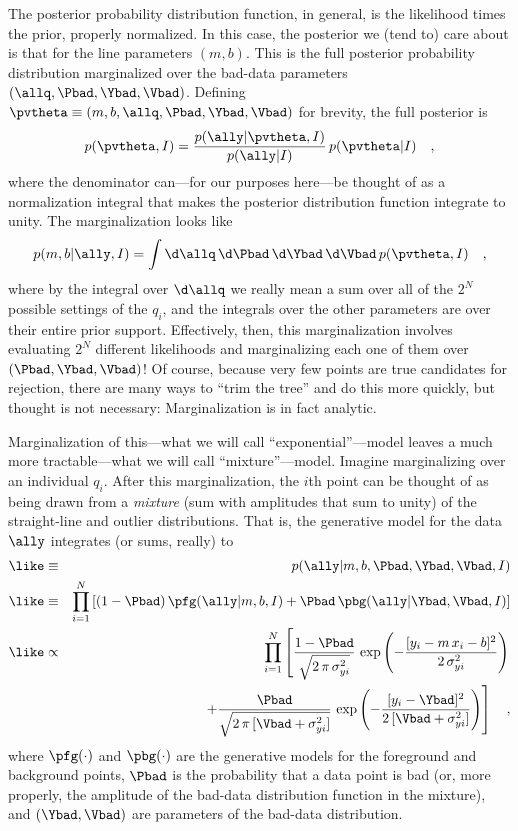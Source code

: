 \documentclass[12pt,twoside,pdftex]{article}
\begin{document}
The posterior probability distribution function, in general, is the
likelihood times the prior, properly normalized.  In this case, the
posterior we (tend to) care about is that for the line parameters
$(m,b)$.  This is the full posterior probability distribution
marginalized over the bad-data parameters $(\allq,\Pbad,\Ybad,\Vbad)$.
Defining $\pvtheta\equiv(m,b,\allq,\Pbad,\Ybad,\Vbad)$ for brevity, the
full posterior is
\begin{equation}
p(\pvtheta,I) =
 \frac{p(\ally|\pvtheta,I)}{p(\ally|I)}
 \,p(\pvtheta|I)
 \quad,
\end{equation}
where the denominator can---for our purposes here---be thought of as a
normalization integral that makes the posterior distribution function
integrate to unity.  The marginalization looks like
\begin{equation}
p(m,b|\ally,I)=\int \d\allq\,\d\Pbad\,\d\Ybad\,\d\Vbad
 \,p(\pvtheta,I) \quad,
\end{equation}
where by the integral over $\d\allq$ we really mean a sum over all of
the $2^N$ possible settings of the $q_i$, and the integrals over the
other parameters are over their entire prior support.  Effectively,
then, this marginalization involves evaluating $2^N$ different
likelihoods and marginalizing each one of them over
$(\Pbad,\Ybad,\Vbad)$!  Of course, because very few points are true
candidates for rejection, there are many ways to ``trim the tree'' and
do this more quickly, but thought is not necessary: Marginalization is
in fact analytic.

Marginalization of this---what we will call ``exponential''---model
leaves a much more tractable---what we will call ``mixture''---model.
Imagine marginalizing over an individual $q_i$.  After this
marginalization, the $i$th point can be thought of as being drawn from
a \emph{mixture} (sum with amplitudes that sum to unity) of the
straight-line and outlier distributions.  That is, the generative
model for the data $\ally$ integrates (or sums, really) to
\begin{eqnarray}\label{eq:mixture}\displaystyle
\like &\equiv& p(\ally|m,b,\Pbad,\Ybad,\Vbad,I)
 \nonumber\\
\like &\equiv& \prod_{i=1}^N
 \left[ (1-\Pbad)\,\pfg(\ally|m,b,I)
 + \Pbad\,\pbg(\ally|\Ybad,\Vbad,I) \right]
 \nonumber\\
\like &\propto&
 \prod_{i=1}^N \left[\frac{1-\Pbad}{\sqrt{2\,\pi\,\sigma_{yi}^2}}
 \,\exp\left(-\frac{[y_i-m\,x_i-b]^2}{2\,\sigma_{yi}^2}\right)\right.
 \nonumber \\ & & \quad
 \left.+ \frac{\Pbad}{\sqrt{2\,\pi\,[\Vbad+\sigma_{yi}^2]}}
 \,\exp\left(-\frac{[y_i-\Ybad]^2}{2\,[\Vbad+\sigma_{yi}^2]}\right)\right]
 \quad ,
\end{eqnarray}
where $\pfg(\cdot)$ and $\pbg(\cdot)$ are the generative models for
the foreground and background points, $\Pbad$ is the probability that
a data point is bad (or, more properly, the amplitude of the bad-data
distribution function in the mixture), and $(\Ybad,\Vbad)$ are
parameters of the bad-data distribution.
\end{document}
